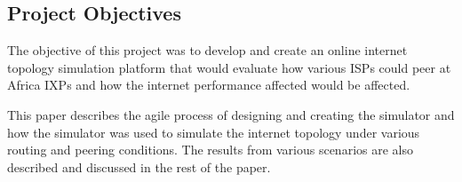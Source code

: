 \subsection{Project Objectives}
The objective of this project was to develop and create an online internet topology simulation platform that would evaluate how various ISPs could peer at Africa IXPs and how the internet performance affected would be affected. 

This paper describes the agile process of designing and creating the simulator and how the simulator was used to simulate the internet topology under various routing and peering conditions. The results from various scenarios are also described and discussed in the rest of the paper.  

